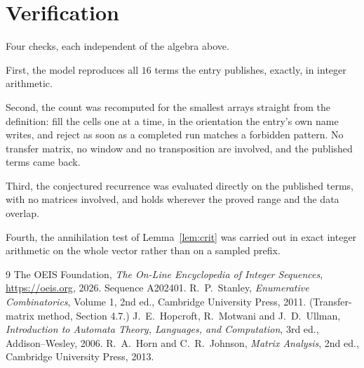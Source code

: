 \documentclass[11pt,a4paper]{article}
\theoremstyle{plain}
\theoremstyle{definition}
\begin{document}
\section{Verification}

Four checks, each independent of the algebra above.

First, the model reproduces all $16$ terms the entry publishes, exactly, in integer
arithmetic.

Second, the count was recomputed for the smallest arrays straight from the definition: fill the
cells one at a time, in the orientation the entry's own name writes, and reject as soon as a
completed run matches a forbidden pattern. No transfer matrix, no window and no transposition
are involved, and the published terms came back.

Third, the conjectured recurrence was evaluated directly on the published terms, with no
matrices involved, and holds wherever the proved range and the data overlap.

Fourth, the annihilation test of Lemma~\ref{lem:crit} was carried out in exact integer
arithmetic on the whole vector rather than on a sampled prefix.

\begin{thebibliography}{9}
 The OEIS Foundation, \emph{The On-Line Encyclopedia of Integer
Sequences}, \url{https://oeis.org}, 2026. Sequence A202401.
 R.~P.~Stanley, \emph{Enumerative Combinatorics}, Volume 1, 2nd ed.,
Cambridge University Press, 2011. (Transfer-matrix method, Section 4.7.)
 J.~E.~Hopcroft, R.~Motwani and J.~D.~Ullman, \emph{Introduction to Automata
Theory, Languages, and Computation}, 3rd ed., Addison--Wesley, 2006.
 R.~A.~Horn and C.~R.~Johnson, \emph{Matrix Analysis}, 2nd ed., Cambridge
University Press, 2013.
\end{thebibliography}
\end{document}
